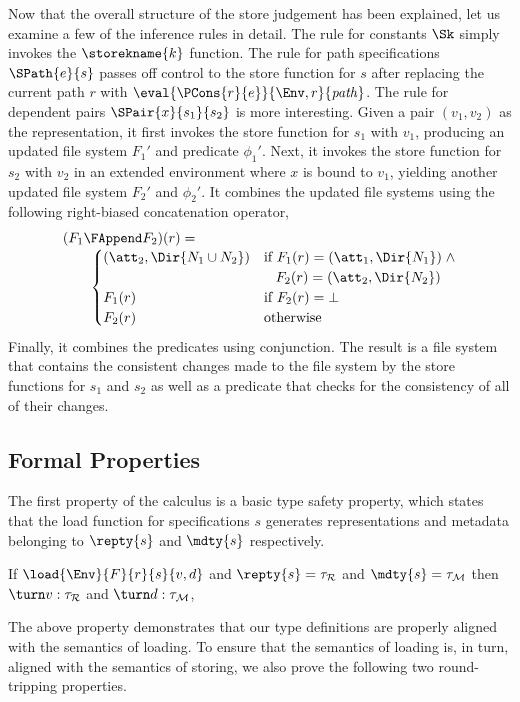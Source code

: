 Now that the overall structure of the store judgement has been
explained,
let us examine a few of the inference rules in detail. The rule for
constants $\Sk$ simply invokes the $\storekname{k}$ function. 
The rule for path specifications $\SPath{e}{s}$ passes off
control to the store function for $s$ after replacing the current path
$r$ with $\eval{\PCons{r}{e}}{\Env,r}{\mathit{path}}$. The rule for
dependent pairs $\SPair{x}{s_1}{s_2}$ is more interesting. Given a
pair $(v_1,v_2)$ as the representation, it first invokes the store
function for $s_1$ with $v_1$, producing an updated file system $F_1'$
and predicate $\phi_1'$. Next, it invokes the store function for $s_2$
with $v_2$ in an extended environment where $x$ is bound to $v_1$,
yielding another updated file system $F_2'$ and $\phi_2'$. It combines
the updated file systems using the following right-biased
concatenation operator,
%
\[
\begin{array}{l}
(F_1 \FAppend F_2)(r) = \\
\qquad 
\begin{cases}
  (\att_2,\Dir{N_1 \cup N_2}) & \text{if}~F_1(r) = (\att_1,\Dir{N_1}) \; \wedge \\
                              & \;\;\; F_2(r) = (\att_2,\Dir{N_2})\\
  F_1(r) & \text{if}~F_2(r) = \bot\\
  F_2(r) & \text{otherwise}\\
\end{cases}
\end{array}
\]
%
Finally, it combines the predicates using conjunction. The result is a
file system that contains the consistent changes made to the file
system by the store functions for $s_1$ and $s_2$ as well as a
predicate that checks for the consistency of all of their changes. 

\subsection{Formal Properties}

The first property of the \forest{} calculus is a basic type safety
property, which states that the load function for
specifications $s$ generates representations and metadata belonging to
$\repty{s}$ and $\mdty{s}$ respectively.
%
\begin{proposition}
  If $\load{\Env}{F}{r}{s}{v,d}$ and $\repty{s} = \tau_{\mathcal{R}}$
  and $\mdty{s} = \tau_{\mathcal{M}}$ then $\turn v :
  \tau_{\mathcal{R}}$ and $\turn d : \tau_{\mathcal{M}}$,
\end{proposition}
%
The above property demonstrates that our type definitions are properly
aligned with the semantics of loading.  To ensure that the semantics
of loading is, in turn, aligned with the semantics of 
storing, we also prove the following two round-tripping
properties.
%

